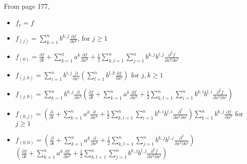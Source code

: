 \documentclass[12pt]{article}
\begin{document}
From page 177,
\begin{itemize}
\item $f_v = f$
\item $f_{(j)} = \sum_{k=1}^n b^{k,j} \frac{\partial f}{\partial x^k}$, for $j \ge 1$
\item $f_{(0)} = \frac{\partial f}{\partial t} + \sum_{k=1}^n a^k \frac{\partial f}{\partial x^k} + \frac{1}{2} \sum_{k,l=1}^n \sum_{j=1}^n b^{k,j} b^{l,j} \frac{\partial^2 f}{\partial x^k \partial x^l}$
\item $f_{(j, k)} = \sum_{i=1}^n b^{i,j} \frac{\partial }{\partial x^i} \left( \sum_{l=1}^n b^{l,k} \frac{\partial f}{\partial x^l} \right) $ for $j,k \ge 1$
\item $f_{(j,0)} = \sum_{k=1}^n b^{k,j} \frac{\partial }{\partial x^k} \left( \frac{\partial f}{\partial t} + \sum_{k=1}^n a^k \frac{\partial f}{\partial x^k} + \frac{1}{2} \sum_{k,l=1}^n \sum_{i=1}^n b^{k,i} b^{l,i} \frac{\partial^2 f}{\partial x^k \partial x^l} \right)$
\item $f_{(0, j)} = \left( \frac{\partial}{\partial t} + \sum_{k=1}^n a^k \frac{\partial}{\partial x^k} + \frac{1}{2} \sum_{k,l=1}^n \sum_{i=1}^n b^{k,i} b^{l,i} \frac{\partial^2}{\partial x^k \partial x^l} \right)  \sum_{k=1}^n b^{k,j} \frac{\partial f}{\partial x^k}$ for $j \ge 1$
\item $f_{(0,0)} = \left( \frac{\partial}{\partial t} + \sum_{k=1}^n a^k \frac{\partial}{\partial x^k} + \frac{1}{2} \sum_{k,l=1}^n \sum_{j=1}^n b^{k,j} b^{l,j} \frac{\partial^2}{\partial x^k \partial x^l} \right) $\\ $ \left( \frac{\partial f}{\partial t} + \sum_{k=1}^n a^k \frac{\partial f}{\partial x^k} + \frac{1}{2} \sum_{k,l=1}^n \sum_{j=1}^n b^{k,j} b^{l,j} \frac{\partial^2 f}{\partial x^k \partial x^l} \right)$
\end{itemize}
\end{document}
